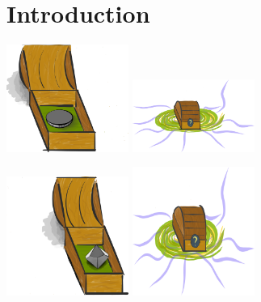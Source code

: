 \section{Introduction}



\includegraphics[width=0.3\textwidth]{img/big-box-open-coin}
\includegraphics[width=0.3\textwidth]{img/big-box-closed-portal}

\includegraphics[width=0.3\textwidth]{img/small-box-open-die}
\includegraphics[width=0.3\textwidth]{img/small-box-closed-portal}
